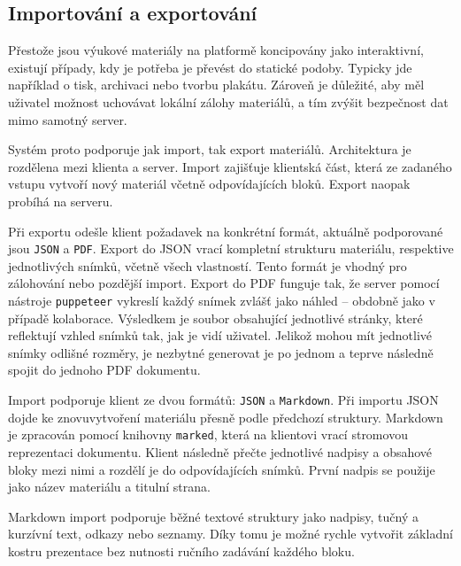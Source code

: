 \subsection{Importování a exportování}

Přestože jsou výukové materiály na platformě koncipovány jako interaktivní, existují případy, kdy je potřeba je převést do statické podoby.
Typicky jde například o tisk, archivaci nebo tvorbu plakátu. 
Zároveň je důležité, aby měl uživatel možnost uchovávat lokální zálohy materiálů, a tím zvýšit bezpečnost dat mimo samotný server.

Systém proto podporuje jak import, tak export materiálů. 
Architektura je rozdělena mezi klienta a server. Import zajišťuje klientská část, která ze zadaného vstupu vytvoří nový materiál včetně odpovídajících bloků. 
Export naopak probíhá na serveru.

Při exportu odešle klient požadavek na konkrétní formát, aktuálně podporované jsou \texttt{JSON} a \texttt{PDF}. 
Export do JSON vrací kompletní strukturu materiálu, respektive jednotlivých snímků, včetně všech vlastností. 
Tento formát je vhodný pro zálohování nebo pozdější import. 
Export do PDF funguje tak, že server pomocí nástroje \texttt{puppeteer} vykreslí každý snímek zvlášť jako náhled -- obdobně jako v případě kolaborace. 
Výsledkem je soubor obsahující jednotlivé stránky, které reflektují vzhled snímků tak, jak je vidí uživatel.
Jelikož mohou mít jednotlivé snímky odlišné rozměry, je nezbytné generovat je po jednom a teprve následně spojit do jednoho PDF dokumentu.

Import podporuje klient ze dvou formátů: \texttt{JSON} a \texttt{Markdown}. 
Při importu JSON dojde ke znovuvytvoření materiálu přesně podle předchozí struktury. 
Markdown je zpracován pomocí knihovny \texttt{marked}, která na klientovi vrací stromovou reprezentaci dokumentu. 
Klient následně přečte jednotlivé nadpisy a obsahové bloky mezi nimi a rozdělí je do odpovídajících snímků. 
První nadpis se použije jako název materiálu a titulní strana.

Markdown import podporuje běžné textové struktury jako nadpisy, tučný a kurzívní text, odkazy nebo seznamy. 
Díky tomu je možné rychle vytvořit základní kostru prezentace bez nutnosti ručního zadávání každého bloku.


